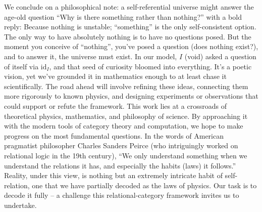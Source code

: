 \documentclass{article}
\begin{document}
We conclude on a philosophical note: a self-referential universe might answer the age-old question “Why is there something rather than nothing?” with a bold reply: Because nothing is unstable; “something” is the only self-consistent option. The only way to have absolutely nothing is to have no questions posed. But the moment you conceive of “nothing”, you’ve posed a question (does nothing exist?), and to answer it, the universe must exist. In our model, $I$ (void) asked a question of itself via $\mathrm{id}_I$, and that seed of curiosity bloomed into everything. It’s a poetic vision, yet we’ve grounded it in mathematics enough to at least chase it scientifically. The road ahead will involve refining these ideas, connecting them more rigorously to known physics, and designing experiments or observations that could support or refute the framework. This work lies at a crossroads of theoretical physics, mathematics, and philosophy of science. By approaching it with the modern tools of category theory and computation, we hope to make progress on the most fundamental questions. In the words of American pragmatist philosopher Charles Sanders Peirce (who intriguingly worked on relational logic in the 19th century), “We only understand something when we understand the relations it has, and especially the habits (laws) it follows.” Reality, under this view, is nothing but an extremely intricate habit of self-relation, one that we have partially decoded as the laws of physics. Our task is to decode it fully – a challenge this relational-category framework invites us to undertake.



\end{document}
